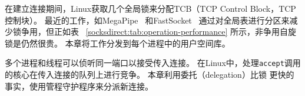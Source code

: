 在建立连接期间，Linux获取几个全局锁来分配TCB（TCP Control Block，TCP控制块）。
最近的工作，如MegaPipe~ \cite {han2012megapipe} 和FastSocket~ \cite {lin2016scalable} 通过对全局表进行分区来减少锁争用，但正如表~ \ref {socksdirect:tab:operation-performance} 所示，非争用自旋锁是仍然很贵。
本章将工作分发到每个进程中的用户空间库\libipc {}。

多个进程和线程可以侦听同一端口以接受传入连接。
在Linux中，处理\texttt {accept}调用的核心在传入连接的队列上进行竞争。
本章利用委托（delegation）比锁 \cite {roghanchi2017ffwd} 更快的事实，使用管程守护程序来分派新连接。








